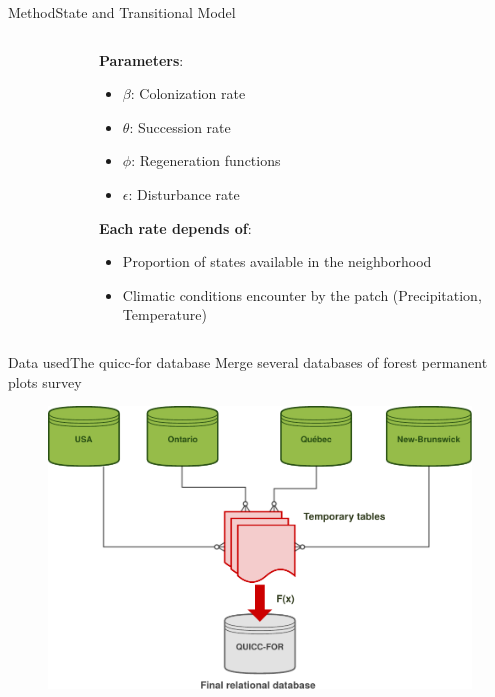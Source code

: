\documentclass[10pt,aspectratio=149]{beamer}
\begin{document}

\begin{frame}{Method}{State and Transitional Model}

\begin{columns}[c]
	\begin{column}[c]{.40\paperwidth}
		\begin{figure}
			\small{}
		\end{figure}
	\end{column}
	\begin{column}[l]{.50\paperwidth}
	\textbf{Parameters}:
	\begin{itemize}
		\item $\beta$: Colonization rate
		\item $\theta$: Succession rate
		\item $\phi$: Regeneration functions
		\item $\epsilon$: Disturbance rate
	\end{itemize}
	\vspace{1em}
	\textbf{Each rate depends of}:
		\begin{itemize}
			\item Proportion of states available in the neighborhood
			\item Climatic conditions encounter by the patch (Precipitation, Temperature)
		\end{itemize}
	\end{column}
\end{columns}

\end{frame}



\begin{frame}{Data used}{The quicc-for database}
	\center Merge several databases of forest permanent plots survey
\begin{figure}
	\includegraphics[width=.60\paperwidth]{Figs/quiccfor.pdf}
\end{figure}

\end{frame}
\end{document}
